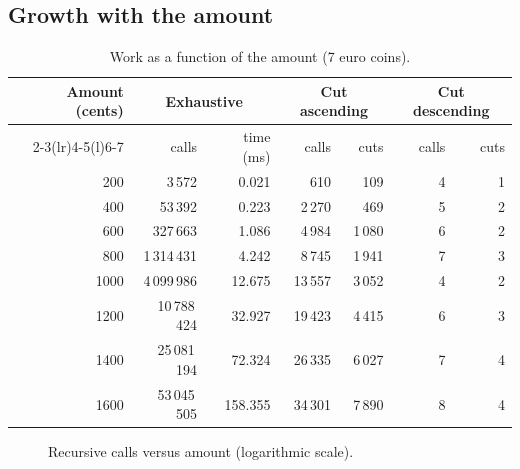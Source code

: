 \documentclass[11pt,a4paper]{article}
\begin{document}
\subsection{Growth with the amount}
\begin{table}[h!]
\centering
\small
\begin{tabular}{@{}rrrrrrr@{}}
\toprule
Amount (cents) & \multicolumn{2}{c}{Exhaustive} & \multicolumn{2}{c}{Cut ascending} & \multicolumn{2}{c}{Cut descending} \\
\cmidrule(lr){2-3}\cmidrule(lr){4-5}\cmidrule(l){6-7}
 & calls & time (ms) & calls & cuts & calls & cuts \\
\midrule
200  & 3\,572 & 0.021 & 610 & 109 & 4 & 1 \\
400  & 53\,392 & 0.223 & 2\,270 & 469 & 5 & 2 \\
600  & 327\,663 & 1.086 & 4\,984 & 1\,080 & 6 & 2 \\
800  & 1\,314\,431 & 4.242 & 8\,745 & 1\,941 & 7 & 3 \\
1000 & 4\,099\,986 & 12.675 & 13\,557 & 3\,052 & 4 & 2 \\
1200 & 10\,788\,424 & 32.927 & 19\,423 & 4\,415 & 6 & 3 \\
1400 & 25\,081\,194 & 72.324 & 26\,335 & 6\,027 & 7 & 4 \\
1600 & 53\,045\,505 & 158.355 & 34\,301 & 7\,890 & 8 & 4 \\
\bottomrule
\end{tabular}
\caption{Work as a function of the amount (7 euro coins).}
\end{table}

\begin{figure}[h!]
\centering
{}
\caption{Recursive calls versus amount (logarithmic scale).}
\end{figure}
\end{document}
